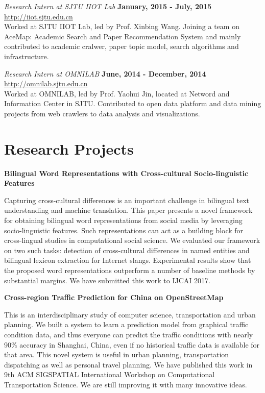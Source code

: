 \documentclass[margin,line]{res}
\begin{document}
\begin{resume}
{\em Research Intern at SJTU IIOT Lab} \hfill {\bf January, 2015 - July, 2015}\\
\url{http://iiot.sjtu.edu.cn}\\
Worked at SJTU IIOT Lab, led by Prof. Xinbing Wang. Joining a team on AceMap: Academic Search and Paper Recommendation System and mainly contributed to academic cralwer, paper topic model, search algorithms and infrastructure.

{\em Research Intern at OMNILAB} \hfill {\bf June, 2014 - December, 2014}\\
\url{http://omnilab.sjtu.edu.cn}\\
Worked at OMNILAB, led by Prof. Yaohui Jin, located at Netword and Information Center in SJTU. Contributed to open data platform and data mining projects from web crawlers to data analysis and visualizations.
\section{\sc Research Projects}
{\bf Bilingual Word Representations with Cross-cultural Socio-linguistic Features}

\vspace{-.3cm}
Capturing cross-cultural differences is an important challenge in bilingual text understanding and machine translation. This paper presents a novel framework for obtaining bilingual word representations from social media by leveraging socio-linguistic features. Such representations can act as a building block for cross-lingual studies in computational social science. We evaluated our framework on two such tasks: detection of cross-cultural differences in named entities and bilingual lexicon extraction for Internet slangs. Experimental results show that the proposed word representations outperform a number of baseline methods by substantial margins. We have submitted this work to IJCAI 2017.

{\bf Cross-region Traffic Prediction for China on OpenStreetMap}

\vspace{-.3cm}
This is an interdisciplinary study of computer science, transportation and urban planning. We built a system to learn a prediction model from graphical traffic condition data, and thus everyone can predict the traffic conditions with nearly 90\% accuracy in Shanghai, China, even if no historical traffic data is available for that area. This novel system is useful in urban planning, transportation dispatching as well as personal travel planning. We have published this work in 9th ACM SIGSPATIAL International Workshop on Computational Transportation Science. We are still improving it with many innovative ideas.


\end{resume}
\end{document}
